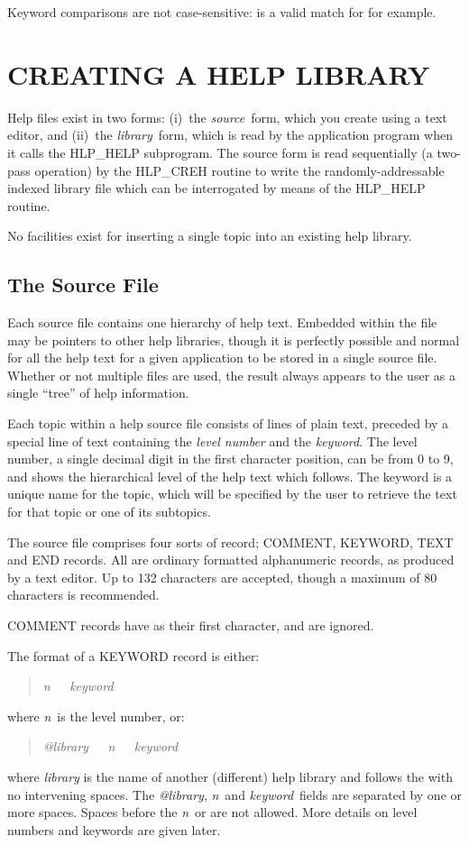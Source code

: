 \documentclass[11pt,nolof]{starlink}
\providecommand{\qt}[1]{``{\tt{#1}}''}
\providecommand{\fstring}[1]{\hbox{\hspace{0.05em}{\qt{#1}}\hspace{0.05em}}}
\begin{document}
Keyword comparisons are not case-sensitive: \fstring{aBc} is a valid match for
\fstring{ABC} for example.

\section{CREATING A HELP LIBRARY}
Help files exist in two forms: (i)~the \textit{source}\, form, which you
create using a text editor, and (ii)~the \textit{library}\, form, which
is read by the application program when it
calls the HLP\_HELP subprogram.  The source form is read
sequentially (a two-pass operation) by the HLP\_CREH routine
to write the randomly-addressable indexed library file which
can be interrogated by means of the HLP\_HELP routine.

No facilities exist for inserting a single topic into an existing
help library.

\subsection{The Source File}
Each source file contains one hierarchy of help text.  Embedded
within the file may be pointers to other help libraries, though
it is perfectly possible and normal for all the help text for a given
application to be stored in a single source file.  Whether or not
multiple files are used, the result always appears to the user as a
single ``tree'' of help information.

Each topic within a help source file consists of lines of plain
text, preceded by a special line of text containing the \textit{level
number} and the \textit{keyword}.  The level number, a single decimal
digit in the first character position, can be from 0 to 9, and shows
the hierarchical level of the help text which follows.  The keyword
is a unique name for the topic, which will be specified by the
user to retrieve the text for that topic or one of its subtopics.

The source file comprises four sorts of record;  COMMENT, KEYWORD,
TEXT and END records.  All are ordinary formatted alphanumeric
records, as produced by a text editor.  Up to 132 characters
are accepted, though a maximum of 80 characters is recommended.

COMMENT records have \fstring{!} as their first character, and are ignored.

The format of a KEYWORD record is either:
\begin{verse}
\textit{n~~~keyword}
\end{verse}
where \textit{n}\, is the level number, or:
\begin{verse}
\textit{@library~~~n~~~keyword}
\end{verse}
where \textit{library} is the name of another (different) help library and
follows the \fstring{@} with no intervening spaces.  The \textit{@library},
\textit{n}\, and \textit{keyword}\, fields are separated by one or more spaces.
Spaces before the \textit{n}\, or \fstring{@} are
not allowed.  More details on level numbers and keywords are
given later.
\end{document}
